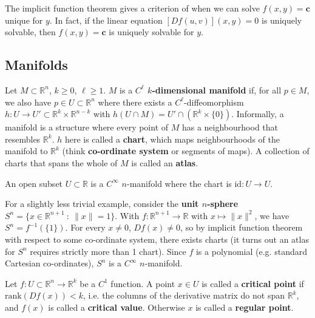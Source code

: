 \documentclass[letter-paper]{tufte-book}
\newenvironment{example}[1][Example]{\begin{trivlist}
\item[\hskip \labelsep {\bfseries #1}]}{\end{trivlist}}
\begin{document}
The implicit function theorem gives a criterion of when we can solve $f(x, y) =
\boldsymbol{c}$ unique for $y$. In fact, if the linear equation $[Df(u, v)](x,
y) = 0$ is uniquely solvable, then $f(x, y) = \boldsymbol{c}$ is uniquely
solvable for $y$.


\subsection{Manifolds}

Let $M \subset \mathbb{R}^n$, $k \geq 0$, $\ell \geq 1$. $M$ is a
\textbf{$C^\ell$ $k$-dimensional manifold} if, for all $p \in M$, we also have
$p \in U \subset \mathbb{R}^n$ where there exists a $C^\ell$-diffeomorphism $h :
U \to U' \subset \mathbb{R}^k \times \mathbb{R}^{n-k}$ with $h(U \cap M) = U'
\cap (\mathbb{R}^k \times \{0\})$. Informally, a manifold is a structure where
every point of $M$ has a neighbourhood that resembles $\mathbb{R}^k$. $h$ here
is called a \textbf{chart}, which maps neighbourhoods of the manifold to
$\mathbb{R}^k$ (think \textbf{co-ordinate system} or segments of maps). A
collection of charts that spans the whole of $M$ is called an
\textbf{atlas}.

\begin{example}
  An open subset $U \subset \mathbb{R}$ is a $C^\infty$ $n$-manifold where the
  chart is $\mbox{id}: U \to U$.
  
  For a slightly less trivial example, consider the \textbf{unit $n$-sphere}
  $S^n = \{ x \in \mathbb{R}^{n+1}\ :\ \|x\| = 1\}$. With $f : \mathbb{R}^{n+1} \to \mathbb{R}$ with $x \mapsto \|x\|^2$,
  we have $S^n = f^{-1}(\{1\})$. For every $x \neq 0$, $Df(x) \neq 0$, so by
  implicit function theorem with respect to some co-ordinate system, there
  exists charts (it turns out an atlas for $S^n$ requires strictly more than 1
  chart). Since $f$ is a polynomial (e.g. standard Cartesian co-ordinates),
  $S^n$ is a $C^\infty$ $n$-manifold.
\end{example}

Let $f : U \subset \mathbb{R}^n \to \mathbb{R}^k$ be a $C^1$ function. A point
$x \in U$ is called a \textbf{critical point} if $\mbox{rank}(Df(x)) < k$, i.e.
the columns of the derivative matrix do not span $\mathbb{R}^k$, and $f(x)$ is
called a \textbf{critical value}. Otherwise $x$ is called a \textbf{regular
point}.
\end{document}
